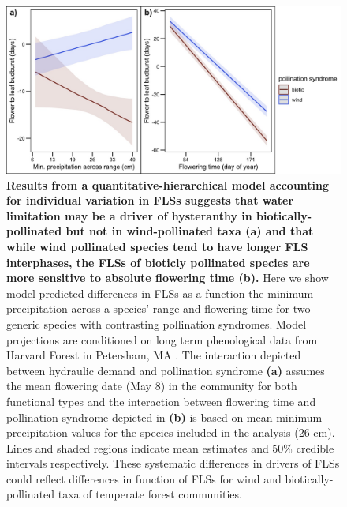 \documentclass[11pt]{article}
\begin{document}
\begin{figure}[H] 
\centering
\includegraphics[height=0.4\textheight]{..//..//apcs.jpeg}
\caption{\textbf{Results from a quantitative-hierarchical model accounting for individual variation in FLSs suggests that water limitation may be a driver of hysteranthy in biotically-pollinated but not in wind-pollinated taxa (a)  and that while wind pollinated species tend to have longer FLS interphases, the FLSs of bioticly pollinated species are more sensitive to absolute flowering time (b).} Here we show model-predicted differences in FLSs as a function the minimum precipitation across a species' range and flowering time for two generic species with contrasting pollination syndromes. Model projections are conditioned on long term phenological data from Harvard Forest in Petersham, MA \citep{OKeefe2015}. The interaction depicted between hydraulic demand and pollination syndrome \textbf{(a)} assumes the mean flowering date (May 8) in the community for both functional types and the interaction between flowering time and pollination syndrome depicted in \textbf{(b)} is based on mean minimum precipitation values for the species included in the analysis (26 cm). Lines and shaded regions indicate mean estimates and 50\% credible intervals respectively. These systematic differences in drivers of FLSs could reflect differences in function of FLSs for wind and biotically-pollinated taxa of temperate forest communities.}
  \label{fig:apcs}
  \end{figure}
  
\end{document}
